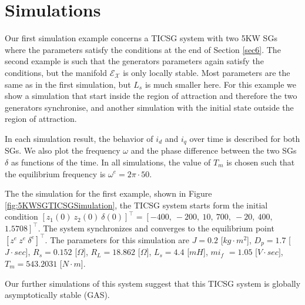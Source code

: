 \documentclass{ifacconf}
\renewcommand{\o}    {{\omega}}
\newcommand{\Emscr}  {{\mathcal{E}}}
\newcommand{\Xmscr}  {{\mathcal{X}}}
\begin{document}
\section{Simulations} \label{sec7} %

Our first simulation example concerns a TICSG system with two 5KW SGs
where the parameters satisfy the conditions at the end of Section
\ref{sec6}. The second example is such that the generators parameters
again satisfy the conditions, but the manifold $\Emscr_\Xmscr$ is only
locally stable. Most parameters are the same as in the first
simulation, but $L_s$ is much smaller here. For this example we show a
simulation that start inside the region of attraction and therefore
the two generators synchronise, and another simulation with the
initial state outside the region of attraction.

In each simulation result, the behavior of $i_d$ and $i_q$ over time
is described for both SGs. We also plot the frequency $\o$ and the
phase difference between the two SGs $\delta$ as functions of the
time. In all simulations, the value of $T_m$ is chosen such that the
equilibrium frequency is $\o^e=2\pi\cdot 50$.

The the simulation for the first example, shown in Figure
\ref{fig:5KWSGTICSGSimulation}, the TICSG system starts form the
initial condition $\left[z_1(0)\ z_2(0)\
\delta(0)\right]^\top=\left[-400,\ -200,\ 10,\ 700,\ -20,\
400,\right.$ $\left. 1.5708 \right]^\top$. The system synchronizes and
converges to the equilibrium point $\left[z^e\ z^e \ \delta^e
\right]^\top$. The parameters for this simulation are $J=0.2$
{[}$kg\cdot m^{2}${]}, $D_p=1.7$ {[}$J\cdot sec${]}, $R_s=0.152$
{[}$\Omega]$, $R_L=18.862$ {[}$\Omega]$, $L_{s}=4.4$ {[}$mH${]},
$mi_f$ $=1.05$ {[}$V\cdot sec]$, $T_m=543.2031$ {[}$N\cdot m${]}.

Our further simulations of this system suggest that this TICSG system 
is globally asymptotically stable (GAS).
\end{document}
